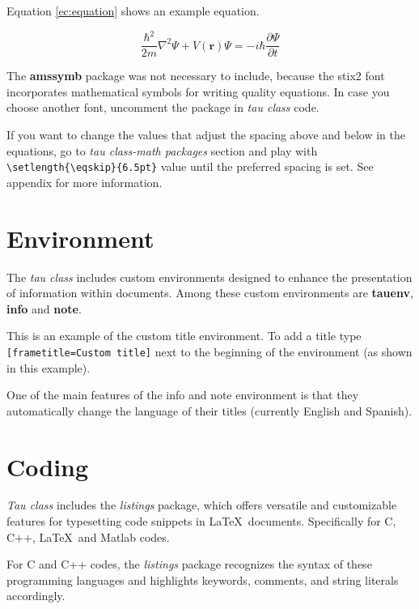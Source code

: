 \documentclass[9pt,a4paper,twoside]{tau}
\begin{document}
        Equation \ref{ec:equation} shows an example equation. 

	\begin{equation} \label{ec:equation}
            \frac{\hbar^2}{2m}\nabla^2\Psi + V(\mathbf{r})\Psi = -i\hbar \frac{\partial\Psi}{\partial t}
	\end{equation} 

        The \textbf{amssymb} package was not necessary to include, because the stix2 font incorporates mathematical symbols for writing quality equations. In case you choose another font, uncomment the package in \textit{tau class} code.

        If you want to change the values that adjust the spacing above and below in the equations, go to \textit{tau class-math packages} section and play with \verb|\setlength{\eqskip}{6.5pt}| value until the preferred spacing is set. See appendix for more information.

\section{Environment}

    The \textit{tau class} includes custom environments designed to enhance the presentation of information within documents. Among these custom environments are \textbf{tauenv}, \textbf{info} and \textbf{note}.

    \begin{tauenv}[frametitle=Custom title]
        This is an example of the custom title environment. To add a title type \verb|[frametitle=Custom title]| next to the beginning of the environment (as shown in this example).
    \end{tauenv}

    One of the main features of the info and note environment is that they automatically change the language of their titles (currently English and Spanish).

\section{Coding}

    \textit{Tau class} includes the \textit{listings} package, which offers versatile and customizable features for typesetting code snippets in \LaTeX\ documents. Specifically for C, C++, \LaTeX\ and Matlab codes. 

    For C and C++ codes, the \textit{listings} package recognizes the syntax of these programming languages and highlights keywords, comments, and string literals accordingly.
\end{document}
